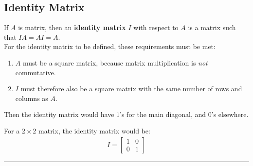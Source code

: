 \documentclass[../notes.tex]{subfiles}
\begin{document}
			\subsection{Identity Matrix}
				If $A$ is matrix, then an \textbf{identity matrix} $I$ with respect to $A$ is a matrix such that $IA = AI = A$.\\
				For the identity matrix to be defined, these requirements must be met:
				\begin{enumerate}
					\item $A$ must be a square matrix, because matrix multiplication is \textit{not} commutative.
					\item $I$ must therefore also be a square matrix with the same number of rows and columns as $A$.
				\end{enumerate}
				Then the identity matrix would have $1$'s for the main diagonal, and $0$'s elsewhere.
				\begin{examplebox}
					For a $2 \times 2$ matrix, the identity matrix would be:
						\begin{align*}
							I = \begin{bmatrix}
								1 & 0\\
								0 & 1
							\end{bmatrix}
						\end{align*}
				\end{examplebox}
	\noindent\rule{\textwidth}{0.4pt}
\end{document}
